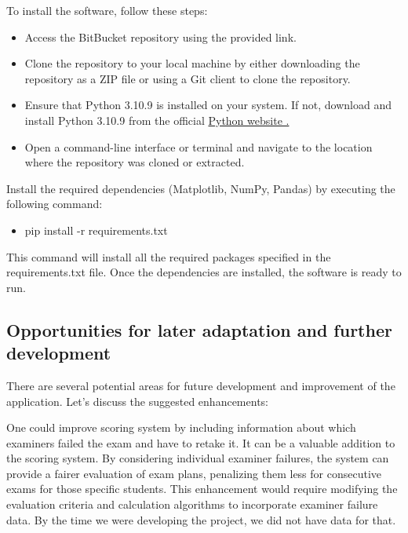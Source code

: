 To install the software, follow these steps:

\begin{itemize}
\item Access the BitBucket repository using the provided link.
\item Clone the repository to your local machine by either downloading the repository as a ZIP file or using a Git client to clone the repository.
\item Ensure that Python 3.10.9 is installed on your system. If not, download and install Python 3.10.9 from the official \href{https://www.python.org}{Python website .} 
\item Open a command-line interface or terminal and navigate to the location where the repository was cloned or extracted.
\end{itemize}






Install the required dependencies (Matplotlib, NumPy, Pandas) by executing the following command:


\begin{itemize}
 
\item pip install -r requirements.txt
\end{itemize}

This command will install all the required packages specified in the requirements.txt file.
Once the dependencies are installed, the software is ready to run.


\subsection{Opportunities for later adaptation and further development}
There are several potential areas for future development and improvement of the application. Let's discuss the suggested enhancements:

\vspace{\baselineskip}

One could improve scoring system by including information about which examiners failed the exam and have to retake it. It can be a valuable addition to the scoring system. By considering individual examiner failures, the system can provide a fairer evaluation of exam plans, penalizing them less for consecutive exams for those specific students. This enhancement would require modifying the evaluation criteria and calculation algorithms to incorporate examiner failure data. By the time we were developing the project, we did not have data for that.

